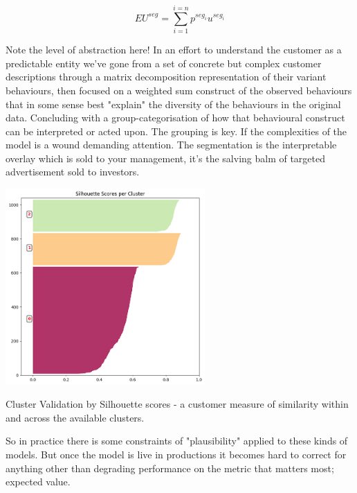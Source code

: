 \documentclass{tufte-handout}
\begin{document}
$$ EU^{seg}  = \sum_{i=1}^{i=n} p^{seg_{i}}u^{seg_i} $$


\noindent Note the level of abstraction here! In an effort to understand the customer as a predictable entity we've gone from a set of concrete but complex customer descriptions through a matrix decomposition representation of their variant behaviours, then focused on a weighted sum construct of the observed behaviours that in some sense best "explain" the diversity of the behaviours in the original data. Concluding with a group-categorisation of how that behavioural construct can be interpreted or acted upon. The grouping is key. If the complexities of the model is a wound demanding attention. The segmentation is the interpretable overlay which is sold to your management, it's the salving balm of targeted advertisement sold to investors.

\begin{marginfigure}
\includegraphics[width=3in, height=5.in]{Plots/silhouette_scores.png}
\caption{Cluster Validation by Silhouette scores - a customer measure of similarity within and across the available clusters.}
\end{marginfigure}

\noindent So in practice there is some constraints of "plausibility" applied to these kinds of models. But once the model is live in productions it becomes hard to correct for anything other than degrading performance on the metric that matters most; expected value. 
\end{document}
